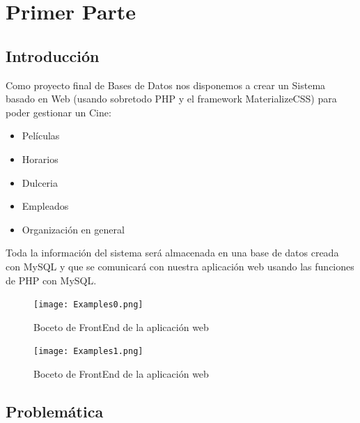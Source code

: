 \documentclass[12pt, fleqn]{report}                             %
\begin{document}
\chapter{Primer Parte}
\clearpage

    \section{Introducción}

        Como proyecto final de Bases de Datos nos disponemos a crear un Sistema basado en Web 
        (usando sobretodo PHP y el framework MaterializeCSS) para poder gestionar un Cine:
        \begin{itemize}
            \item Películas
            \item Horarios
            \item Dulceria
            \item Empleados
            \item Organización en general
        \end{itemize}


        Toda la información del sistema será almacenada en una base de datos creada con MySQL
        y que se comunicará con nuestra aplicación web usando las funciones de PHP con MySQL.

        \clearpage

        \begin{figure}[h!]
            \centering
            \texttt{[image: Examples0.png]}
            \caption{Boceto de FrontEnd de la aplicación web}
        \end{figure}

        \begin{figure}[h!]
            \centering
            \texttt{[image: Examples1.png]}
            \caption{Boceto de FrontEnd de la aplicación web}
        \end{figure}



    \clearpage
    \section{Problemática}
        
\end{document}
